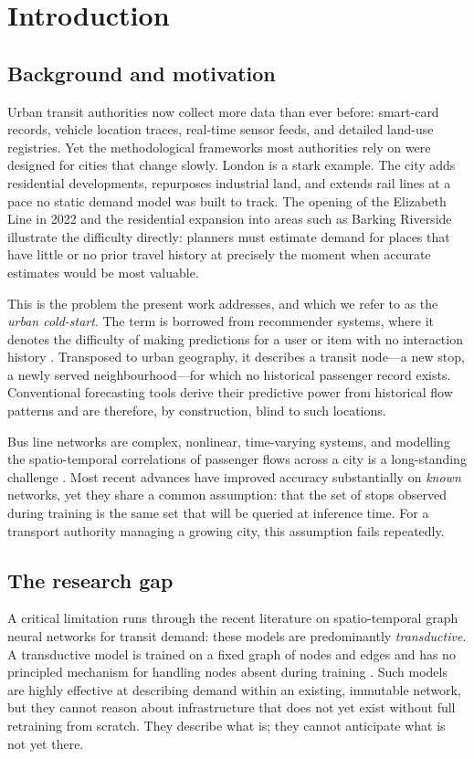 \documentclass[12pt,a4paper]{report}
\begin{document}
\chapter{Introduction}
\label{ch:intro}

\section{Background and motivation}
Urban transit authorities now collect more data than ever before: smart-card
records, vehicle location traces, real-time sensor feeds, and detailed land-use
registries. Yet the methodological frameworks most authorities rely on were
designed for cities that change slowly. London is a stark example. The city
adds residential developments, repurposes industrial land, and extends rail
lines at a pace no static demand model was built to track. The opening of the
Elizabeth Line in 2022 and the residential expansion into areas such as
Barking Riverside illustrate the difficulty directly: planners must estimate
demand for places that have little or no prior travel history at precisely the
moment when accurate estimates would be most valuable.

This is the problem the present work addresses, and which we refer to as the
\emph{urban cold-start}. The term is borrowed from recommender systems, where
it denotes the difficulty of making predictions for a user or item with no
interaction history \citep{schein2002methods}. Transposed to urban geography,
it describes a transit node---a new stop, a newly served neighbourhood---for
which no historical passenger record exists. Conventional forecasting tools
derive their predictive power from historical flow patterns and are therefore,
by construction, blind to such locations.

Bus line networks are complex, nonlinear, time-varying systems, and modelling
the spatio-temporal correlations of passenger flows across a city is a
long-standing challenge \citep{zheng2025mfstgat}. Most recent advances have
improved accuracy substantially on \emph{known} networks, yet they share a
common assumption: that the set of stops observed during training is the same
set that will be queried at inference time. For a transport authority managing
a growing city, this assumption fails repeatedly.

\section{The research gap}
A critical limitation runs through the recent literature on spatio-temporal
graph neural networks for transit demand: these models are predominantly
\emph{transductive}. A transductive model is trained on a fixed graph of nodes
and edges and has no principled mechanism for handling nodes absent during
training \citep{hamilton2017inductive}. Such models are highly effective at
describing demand within an existing, immutable network, but they cannot reason
about infrastructure that does not yet exist without full retraining from
scratch. They describe what is; they cannot anticipate what is not yet there.
\end{document}
